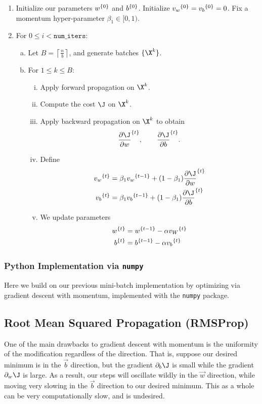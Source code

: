 \begin{enumerate}
	\item Initialize our parameters ${w}^{\{{0}\}}$ and ${b}^{\{{0}\}}$.  Initialize ${v_w}^{\{{0}\}}={v_b}^{\{{0}\}}=0$.  Fix a momentum hyper-parameter $\beta_1\in[0,1)$.
	\item For $0\leq i<\texttt{num\_iters}$:
	\begin{enumerate}[a.]
		\item Let $B=\left\lceil\frac{n}{b}\right\rceil$, and generate batches $\{\X^k\}$.
		\item For $1\leq k\leq B$:
		\begin{enumerate}[i.]
			\item Apply forward propagation on $\X^k$.
			\item Compute the cost $\J$ on $\X^k$.
			\item Apply backward propagation on $\X^k$ to obtain
			$$\iter{\frac{\partial\J}{\partial w}}{t},\qquad \iter{\frac{\partial\J}{\partial b}}{t}.$$
			\item Define
			\begin{align*}
				\iter{v_w}{t}&=\beta_1\iter{v_w}{t-1}+(1-\beta_1)\iter{\frac{\partial\J}{\partial w}}{t}\\
				\iter{v_b}{t}&=\beta_1\iter{v_b}{t-1}+(1-\beta_1)\iter{\frac{\partial\J}{\partial b}}{t}
			\end{align*}
			\item We update parameters
			\begin{align*}
				{w}^{\{{t}\}}&={w}^{\{{t-1}\}}-\alpha {v_W}^{\{{t}\}}\\
				{b}^{\{{t}\}}&={b}^{\{{t-1}\}}-\alpha{v_b}^{\{{t}\}}
			\end{align*}
		\end{enumerate}
	\end{enumerate}
\end{enumerate}



\subsubsection{Python Implementation via \texttt{numpy}}
Here we build on our previous mini-batch implementation by optimizing via gradient descent with momentum, implemented with the \texttt{numpy} package.





\subsection{Root Mean Squared Propagation (RMSProp)}
One of the main drawbacks to gradient descent with momentum is the uniformity of the modification regardless of the direction.  That is, suppose our desired minimum is in the $\vec{b}$ direction, but the gradient $\partial_b\J$ is small while the gradient $\partial_w\J$ is large.  As a result, our steps will oscillate wildly in the $\vec{w}$ direction, while moving very slowing in the $\vec{b}$ direction to our desired minimum.  This as a whole can be very computationally slow, and is undesired.

